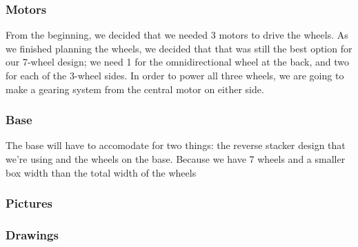 \documentclass[../../main.tex]{subfiles}
\begin{document}
\subsubsection{Motors}
From the beginning, we decided that we needed 3 motors to drive the wheels. As we finished planning the wheels, we decided that that was still the best option for our 7-wheel design; we need 1 for the omnidirectional wheel at the back, and two for each of the 3-wheel sides. In order to power all three wheels, we are going to make a gearing system from the central motor on either side.

\subsubsection{Base}
The base will have to accomodate for two things: the reverse stacker design that we're using and the wheels on the base. Because we have 7 wheels and a smaller box width than the total width of the wheels 

\subsubsection{Pictures}

\subsubsection{Drawings}
\end{document}
